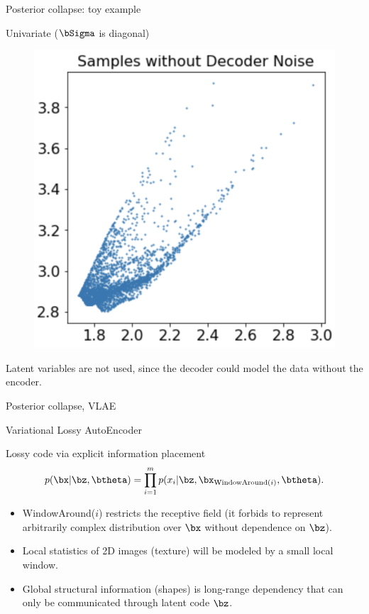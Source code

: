 \begin{frame}{Posterior collapse: toy example}
\begin{block}{Univariate ($\bSigma$ is diagonal)}
\begin{minipage}[t]{0.33\columnwidth}
\begin{figure}[h]
			\end{figure}
		\end{minipage}%
		\begin{minipage}[t]{0.33\columnwidth}
			\begin{figure}[h]
				\centering
				\includegraphics[width=.75\linewidth]{figs/posterior_collapse_toy_6.png}
			\end{figure}
		\end{minipage}
		Latent variables are not used, since the decoder could model the data without the encoder.
	\end{block}
\end{frame}
\begin{frame}{Posterior collapse, VLAE}
\end{frame}
\begin{frame}{Variational Lossy AutoEncoder}
	\begin{block}{Lossy code via explicit information placement}
		\[
		p(\bx | \bz, \btheta) = \prod_{i=1}^m p(x_i | \bz, \bx_{\text{WindowAround}(i)}, \btheta).
		\]
		\begin{itemize}
			\item WindowAround($i$) restricts the receptive field (it forbids to represent arbitrarily complex distribution over $\bx$ without dependence on $\bz$). 
			\item Local statistics of 2D images (texture) will be modeled by a small local window.
			\item Global structural information (shapes) is long-range dependency that can only be communicated through latent code $\bz$. 
		\end{itemize}
	\end{block}
\end{frame}
